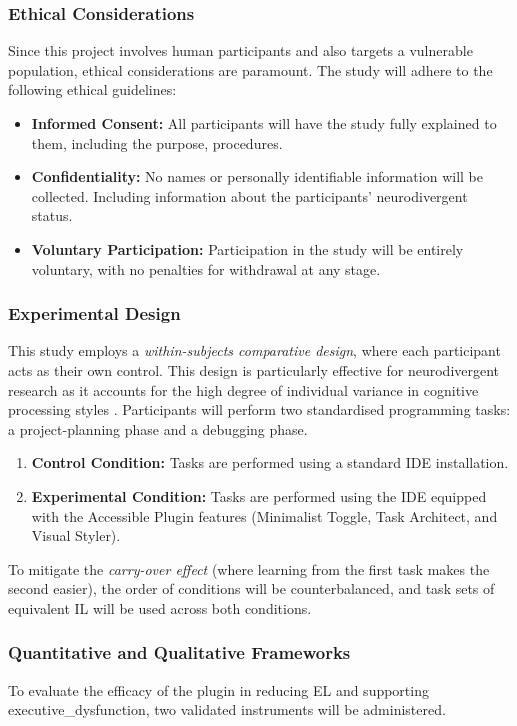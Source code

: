 \subsubsection{Ethical Considerations}
Since this project involves human participants and also targets a vulnerable population, ethical considerations are 
paramount. The study will adhere to the following ethical guidelines:
\begin{itemize}
    \item \textbf{Informed Consent:} All participants will have the study fully explained to them, including the purpose, procedures. 
    \item \textbf{Confidentiality:} No names or personally identifiable information will be collected. Including information about the participants' neurodivergent status.
    \item \textbf{Voluntary Participation:} Participation in the study will be entirely voluntary, with no penalties for withdrawal at any stage.
\end{itemize}

\subsubsection{Experimental Design}
This study employs a \textit{within-subjects comparative design}, where each participant acts as their own control. This design is particularly effective for \gls{neurodivergent} research as it accounts for the high degree of individual variance in cognitive processing styles \cite{verma2025differences}. Participants will perform two standardised programming tasks: a project-planning phase and a debugging phase.

\begin{enumerate}
    \item \textbf{Control Condition:} Tasks are performed using a standard \gls{IDE} installation.
    \item \textbf{Experimental Condition:} Tasks are performed using the \gls{IDE} equipped with the Accessible Plugin features (Minimalist Toggle, Task Architect, and Visual Styler).
\end{enumerate}

To mitigate the \textit{carry-over effect} (where learning from the first task makes the second easier), the order of conditions will be counterbalanced, and task sets of equivalent \gls{IL} will be used across both conditions.

\subsubsection{Quantitative and Qualitative Frameworks}
To evaluate the efficacy of the plugin in reducing \gls{EL} and supporting \gls{executive_dysfunction}, two validated instruments will be administered.

